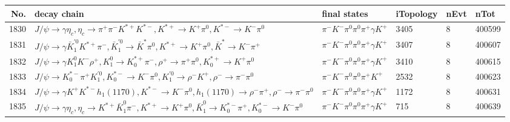 \begin{table}[htbp] 
\begin{center}
\begin{small}
\begin{tabular}{rlllll}\hline\hline
 No. & decay chain & final states &  iTopology & nEvt & nTot \\\hline
1830&$J/\psi       \rightarrow \gamma       \eta_{c}    , \eta_{c}     \rightarrow \pi^{+}        \pi^{-}        K^{*+}         K^{*-}         , K^{*+}          \rightarrow K^{+}          \pi^{0}        , K^{*-}          \rightarrow K^{-}          \pi^{0}        $&$\pi^{-}        K^{-}          \pi^{0}        \pi^{0}        \pi^{+}        \gamma       K^{+}          $& 3405&    8&400599\\
1831&$J/\psi       \rightarrow \gamma       \bar{K}_1^{'0}K^{*+}         \pi^{-}        , \bar{K}_1^{'0} \rightarrow \bar{K}^{*}   \pi^{0}        , K^{*+}          \rightarrow K^{+}          \pi^{0}        , \bar{K}^{*}    \rightarrow K^{-}          \pi^{+}        $&$\pi^{-}        K^{-}          \pi^{0}        \pi^{0}        \pi^{+}        \gamma       K^{+}          $& 3407&    8&400607\\
1832&$J/\psi       \rightarrow \gamma       K_1^{0}        K^{-}          \rho^{+}      , K_1^{0}         \rightarrow K_{0}^{*+}     \pi^{-}        , \rho^{+}       \rightarrow \pi^{+}        \pi^{0}        , K_{0}^{*+}      \rightarrow K^{+}          \pi^{0}        $&$\pi^{-}        K^{-}          \pi^{0}        \pi^{0}        \pi^{+}        \gamma       K^{+}          $& 3410&    8&400615\\
1833&$J/\psi       \rightarrow K_{0}^{*-}     \pi^{+}        K_1^{'0}      , K_{0}^{*-}      \rightarrow K^{-}          \pi^{0}        , K_1^{'0}       \rightarrow \rho^{-}      K^{+}          , \rho^{-}       \rightarrow \pi^{-}        \pi^{0}        $&$\pi^{-}        K^{-}          \pi^{0}        \pi^{0}        \pi^{+}        K^{+}          $& 2532&    8&400623\\
1834&$J/\psi       \rightarrow \gamma       K^{+}          K^{*-}         h_{1}(1170)    , K^{*-}          \rightarrow K^{-}          \pi^{0}        , h_{1}(1170)     \rightarrow \rho^{-}      \pi^{+}        , \rho^{-}       \rightarrow \pi^{-}        \pi^{0}        $&$\pi^{-}        K^{-}          \pi^{0}        \pi^{0}        \pi^{+}        \gamma       K^{+}          $& 1172&    8&400631\\
1835&$J/\psi       \rightarrow \gamma       \eta_{c}    , \eta_{c}     \rightarrow K^{*+}         \bar{K}_1^{0} \pi^{-}        , K^{*+}          \rightarrow K^{+}          \pi^{0}        , \bar{K}_1^{0}  \rightarrow K_{0}^{*-}     \pi^{+}        , K_{0}^{*-}      \rightarrow K^{-}          \pi^{0}        $&$\pi^{-}        K^{-}          \pi^{0}        \pi^{0}        \pi^{+}        \gamma       K^{+}          $&  715&    8&400639\\

\end{tabular}
\end{small}
\end{center}
\end{table}
